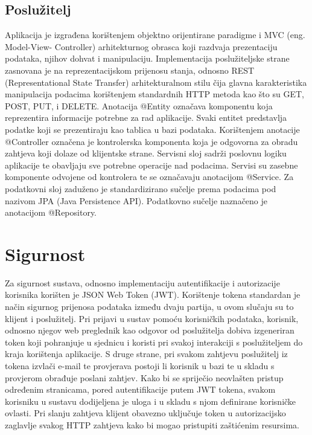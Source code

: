 \subsection{Poslužitelj}
Aplikacija je izgrađena korištenjem objektno orijentirane paradigme i MVC (eng. Model-View-
Controller) arhitekturnog obrasca koji razdvaja prezentaciju podataka, njihov dohvat i manipulaciju. Implementacija poslužiteljske strane zasnovana je na reprezentacijskom prijenosu stanja, odnosno REST (Representational State Transfer) arhitekturalnom stilu čija glavna karakteristika manipulacija podacima korištenjem standardnih HTTP metoda kao što su GET, POST, PUT, i DELETE. Anotacija @Entity označava komponentu koja reprezentira informacije potrebne za rad aplikacije. Svaki entitet predstavlja podatke koji se prezentiraju kao tablica u bazi podataka. Korištenjem anotacije @Controller označena je kontrolerska komponenta koja je odgovorna za obradu zahtjeva koji dolaze od klijentske strane. Servisni sloj sadrži poslovnu logiku aplikacije te obavljaju sve potrebne operacije nad podacima. Servisi su zasebne komponente odvojene od kontrolera te se označavaju anotacijom @Service. Za podatkovni sloj zaduženo je standardizirano sučelje prema podacima pod nazivom JPA (Java Persistence API). Podatkovno sučelje naznačeno je anotacijom @Repository. 

\section{Sigurnost}
Za sigurnost sustava, odnosno implementaciju autentifikacije i autorizacije korisnika korišten je JSON Web Token (JWT). Korištenje tokena standardan je način sigurnog prijenosa podataka između dvaju partija, u ovom slučaju su to klijent i poslužitelj. Pri prijavi u sustav pomoću korisničkih podataka, korisnik, odnosno njegov web preglednik kao odgovor od poslužitelja dobiva izgeneriran token koji pohranjuje u sjednicu i koristi pri svakoj interakciji s poslužiteljem do kraja korištenja aplikacije. S druge strane, pri svakom zahtjevu poslužitelj iz tokena izvlači e-mail te provjerava postoji li korisnik u bazi te u skladu s provjerom obrađuje poslani zahtjev. Kako bi se spriječio neovlašten pristup određenim stranicama, pored autentifikacije putem JWT tokena, svakom korisniku u sustavu dodijeljena je uloga i u skladu s njom definirane korisničke ovlasti. Pri slanju zahtjeva klijent obavezno uključuje token u autorizacijsko zaglavlje svakog HTTP zahtjeva kako bi mogao pristupiti zaštićenim resursima.